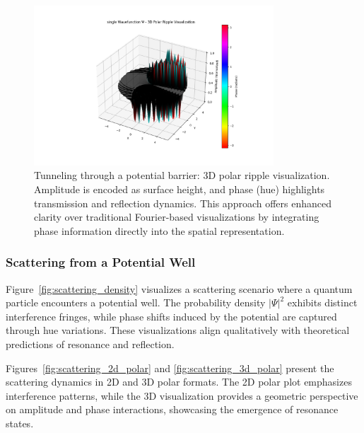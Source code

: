 \documentclass[12pt]{article}
\begin{document}
\begin{figure}[H]
\centering
\includegraphics[width=0.8\textwidth]{images/tunneling_wavefunction_3d_polar_probability_density_with_phase.png}
\caption{Tunneling through a potential barrier: 3D polar ripple visualization. Amplitude is encoded as surface height, and phase (hue) highlights transmission and reflection dynamics. This approach offers enhanced clarity over traditional Fourier-based visualizations by integrating phase information directly into the spatial representation.}
\label{fig:tunneling_3d_polar}
\end{figure}

\subsubsection{Scattering from a Potential Well}

Figure~\ref{fig:scattering_density} visualizes a scattering scenario where a quantum particle encounters a potential well. The probability density \(|\Psi|^2\) exhibits distinct interference fringes, while phase shifts induced by the potential are captured through hue variations. These visualizations align qualitatively with theoretical predictions of resonance and reflection.

Figures~\ref{fig:scattering_2d_polar} and \ref{fig:scattering_3d_polar} present the scattering dynamics in 2D and 3D polar formats. The 2D polar plot emphasizes interference patterns, while the 3D visualization provides a geometric perspective on amplitude and phase interactions, showcasing the emergence of resonance states.
\end{document}
